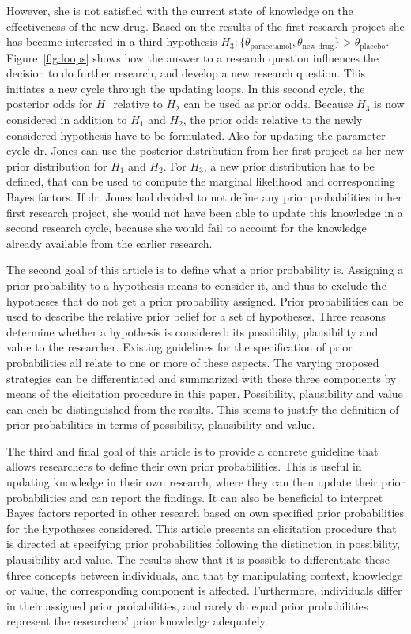 \documentclass[man]{apa6}
\begin{document}
However, she is not satisfied with the current state of knowledge on the effectiveness of the new drug.
Based on the results of the first research project she has become interested in a third hypothesis $H_{3}: \{ \theta_{\text{paracetamol}},\theta_{\text{new drug}} \} > \theta_{\text{placebo}}$.
Figure~\ref{fig:loops} shows how the answer to a research question influences the decision to do further research, and develop a new research question.
This initiates a new cycle through the updating loops.
In this second cycle, the posterior odds for $H_1$ relative to $H_2$ can be used as prior odds.
Because $H_3$ is now considered in addition to $H_1$ and $H_2$, the prior odds relative to the newly considered hypothesis have to be formulated.
Also for updating the parameter cycle dr. Jones can use the posterior distribution from her first project as her new prior distribution for $H_1$ and $H_2$. 
For $H_3$, a new prior distribution has to be defined, that can be used to compute the marginal likelihood and corresponding Bayes factors.
If dr. Jones had decided to not define any prior probabilities in her first research project, she would not have been able to update this knowledge in a second research cycle, because she would fail to account for the knowledge already available from the earlier research.

The second goal of this article is to define what a prior probability is.
Assigning a prior probability to a hypothesis means to consider it, and thus to exclude the hypotheses that do not get a prior probability assigned.
Prior probabilities can be used to describe the relative prior belief for a set of hypotheses.
Three reasons determine whether a hypothesis is considered: its possibility, plausibility and value to the researcher.
Existing guidelines for the specification of prior probabilities all relate to one or more of these aspects.
The varying proposed strategies can be differentiated and summarized with these three components by means of the elicitation procedure in this paper.
Possibility, plausibility and value can each be distinguished from the results.
This seems to justify the definition of prior probabilities in terms of possibility, plausibility and value.

The third and final goal of this article is to provide a concrete guideline that allows researchers to define their own prior probabilities.
This is useful in updating knowledge in their own research, where they can then update their prior probabilities and can report the findings.
It can also be beneficial to interpret Bayes factors reported in other research based on own specified prior probabilities for the hypotheses considered.
This article presents an elicitation procedure that is directed at specifying prior probabilities following the distinction in possibility, plausibility and value.
The results show that it is possible to differentiate these three concepts between individuals, and that by manipulating context, knowledge or value, the corresponding component is affected.
Furthermore, individuals differ in their assigned prior probabilities, and rarely do equal prior probabilities represent the researchers' prior knowledge adequately.
\end{document}
